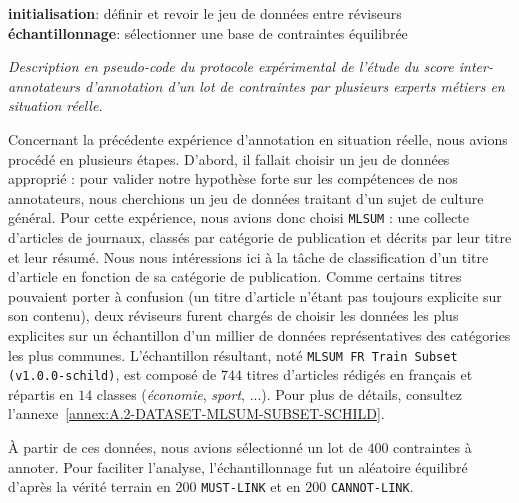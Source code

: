 			\begin{algorithm}
				\textbf{initialisation}: définir et revoir le jeu de données entre réviseurs \;
				\textbf{échantillonnage}: sélectionner une base de contraintes équilibrée \;
				\caption{\textit{
					Description en pseudo-code du protocole expérimental de l'étude du score inter-annotateurs d'annotation d'un lot de contraintes par plusieurs experts métiers en situation réelle.
				}}
				\label{algorithm:4.6.2-ETUDE-ROBUSTESSE-SCORE-INTER-ANNOTATEURS-PROTOCOLE}
			\end{algorithm}
			
			Concernant la précédente expérience d'annotation en situation réelle, nous avions procédé en plusieurs étapes.
			D'abord, il fallait choisir un jeu de données approprié : pour valider notre hypothèse forte sur les compétences de nos annotateurs, nous cherchions un jeu de données traitant d'un sujet de culture général.
			Pour cette expérience, nous avions donc choisi \texttt{MLSUM} : une collecte d'articles de journaux, classés par catégorie de publication et décrits par leur titre et leur résumé.
			Nous nous intéressions ici à la tâche de classification d'un titre d'article en fonction de sa catégorie de publication.
			Comme certains titres pouvaient porter à confusion (un titre d'article n'étant pas toujours explicite sur son contenu), deux réviseurs furent chargés de choisir les données les plus explicites sur un échantillon d'un millier de données représentatives des catégories les plus communes.
			L'échantillon résultant, noté \texttt{MLSUM FR Train Subset (v1.0.0-schild)}, est composé de $744$ titres d'articles rédigés en français et répartis en $14$ classes (\textit{économie}, \textit{sport}, ...).
			Pour plus de détails, consultez l'annexe~\ref{annex:A.2-DATASET-MLSUM-SUBSET-SCHILD}.
		
			À partir de ces données, nous avions sélectionné un lot de $400$ contraintes à annoter.
			Pour faciliter l'analyse, l'échantillonnage fut un aléatoire équilibré d'après la vérité terrain en $200$ \texttt{MUST-LINK} et en $200$ \texttt{CANNOT-LINK}.
			
